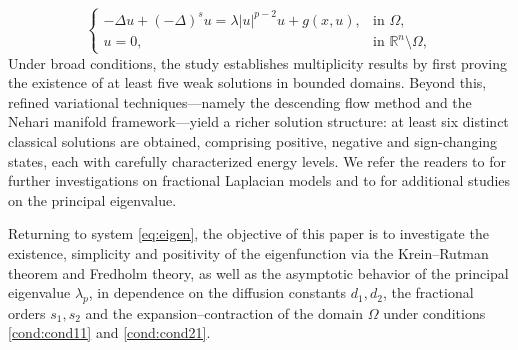 \documentclass[a4paper,11pt]{amsart}
\theoremstyle{definition}
\numberwithin{equation}{section}
\theoremstyle{definition}
\begin{document}
\begin{equation*}
\left\{
\begin{array}{ll}
-\Delta u + (-\Delta)^s u = \lambda |u|^{p-2}u + g(x,u), & \text{in } \Omega, \\[1ex]
u = 0, & \text{in } \mathbb{R}^n \setminus \Omega,
\end{array}
\right.
\end{equation*}
Under broad conditions, the study establishes multiplicity results by first proving the existence of at least five weak solutions in bounded domains. Beyond this, refined variational techniques—namely the descending flow method and the Nehari manifold framework—yield a richer solution structure: at least six distinct classical solutions are obtained, comprising positive, negative and sign-changing states, each with carefully characterized energy levels. We refer the readers to 
\cite{Spatiotemporal_li_2024,dipierro_superposition_neumann_2025,mugnai_pinamonti_vecchi_brezis_oswald_2020,dob_fractional_system_resonance_2022,saadi_fractional_distributional_2021} for further investigations on fractional Laplacian models and to \cite{cowan_smaily_feulefack_mixed_2025,dipierro_neumann_superposition_2025} for additional studies on the principal eigenvalue.







 






Returning to system \eqref{eq:eigen}, the objective of this paper is to investigate the existence, simplicity and positivity of the eigenfunction via the Krein–Rutman theorem and Fredholm theory, as well as the asymptotic behavior of the principal eigenvalue $\lambda_p$, in dependence on the diffusion constants $d_1,d_2$, the fractional orders $s_1,s_2$ and the expansion–contraction of the domain $\Omega$ under conditions \ref{cond:cond11} and \ref{cond:cond21}.
\end{document}
